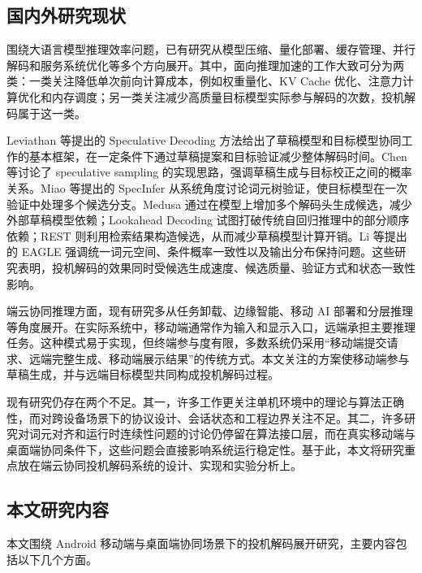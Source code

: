 \subsection{国内外研究现状}

围绕大语言模型推理效率问题，已有研究从模型压缩、量化部署、缓存管理、并行解码和服务系统优化等多个方向展开\cite{ggerganov2025llamacpp,kwon2023pagedattention,frantar2022gptq,dao2022flashattention,song2023powerinfer}。其中，面向推理加速的工作大致可分为两类：一类关注降低单次前向计算成本，例如权重量化、KV Cache 优化、注意力计算优化和内存调度；另一类关注减少高质量目标模型实际参与解码的次数，投机解码属于这一类。

Leviathan 等提出的 Speculative Decoding 方法给出了草稿模型和目标模型协同工作的基本框架，在一定条件下通过草稿提案和目标验证减少整体解码时间\cite{leviathan2023speculative}。Chen 等讨论了 speculative sampling 的实现思路，强调草稿生成与目标校正之间的概率关系\cite{chen2023speculative}。Miao 等提出的 SpecInfer 从系统角度讨论词元树验证，使目标模型在一次验证中处理多个候选分支\cite{miao2023specinfer}。Medusa 通过在模型上增加多个解码头生成候选，减少外部草稿模型依赖\cite{cai2024medusa}；Lookahead Decoding 试图打破传统自回归推理中的部分顺序依赖\cite{fu2024lookahead}；REST 则利用检索结果构造候选，从而减少草稿模型计算开销\cite{he2023rest}。Li 等提出的 EAGLE 强调统一词元空间、条件概率一致性以及输出分布保持问题\cite{li2024eagle}。这些研究表明，投机解码的效果同时受候选生成速度、候选质量、验证方式和状态一致性影响。

端云协同推理方面，现有研究多从任务卸载、边缘智能、移动 AI 部署和分层推理等角度展开\cite{satyanarayanan2017edge,shi2016edge,alizadeh2023llmflash}。在实际系统中，移动端通常作为输入和显示入口，远端承担主要推理任务。这种模式易于实现，但终端参与度有限，多数系统仍采用“移动端提交请求、远端完整生成、移动端展示结果”的传统方式。本文关注的方案使移动端参与草稿生成，并与远端目标模型共同构成投机解码过程。

现有研究仍存在两个不足。其一，许多工作更关注单机环境中的理论与算法正确性，而对跨设备场景下的协议设计、会话状态和工程边界关注不足。其二，许多研究对词元对齐和运行时连续性问题的讨论仍停留在算法接口层，而在真实移动端与桌面端协同条件下，这些问题会直接影响系统运行稳定性。基于此，本文将研究重点放在端云协同投机解码系统的设计、实现和实验分析上。

\subsection{本文研究内容}

本文围绕 Android 移动端与桌面端协同场景下的投机解码展开研究，主要内容包括以下几个方面。

